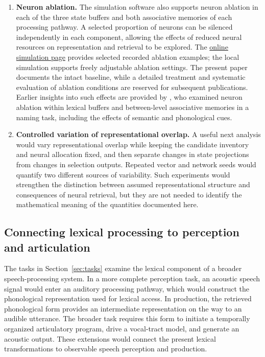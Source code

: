 \begin{enumerate}
\item \textbf{Neuron ablation.} The simulation software also supports neuron ablation in each of the three state buffers and both associative memories of each processing pathway. A selected proportion of neurons can be silenced independently in each component, allowing the effects of reduced neural resources on representation and retrieval to be explored. The \href{https://www.speechtrainer.eu/nef-spa-lexical-model.htm}{online simulation page} provides selected recorded ablation examples; the local simulation supports freely adjustable ablation settings. The present paper documents the intact baseline, while a detailed treatment and systematic evaluation of ablation conditions are reserved for subsequent publications. Earlier insights into such effects are provided by \citet{stille2020}, who examined neuron ablation within lexical buffers and between-level associative memories in a naming task, including the effects of semantic and phonological cues.

\item \textbf{Controlled variation of representational overlap.} A useful next analysis would vary representational overlap while keeping the candidate inventory and neural allocation fixed, and then separate changes in state projections from changes in selection outputs. Repeated vector and network seeds would quantify two different sources of variability. Such experiments would strengthen the distinction between assumed representational structure and consequences of neural retrieval, but they are not needed to identify the mathematical meaning of the quantities documented here.
\end{enumerate}

\subsection{Connecting lexical processing to perception and articulation}
\label{sec:sensorimotor-interfaces}
The tasks in Section~\ref{sec:tasks} examine the lexical component of a broader speech-processing system. In a more complete perception task, an acoustic speech signal would enter an auditory processing pathway, which would construct the phonological representation used for lexical access. In production, the retrieved phonological form provides an intermediate representation on the way to an audible utterance. The broader task requires this form to initiate a temporally organized articulatory program, drive a vocal-tract model, and generate an acoustic output. These extensions would connect the present lexical transformations to observable speech perception and production.

